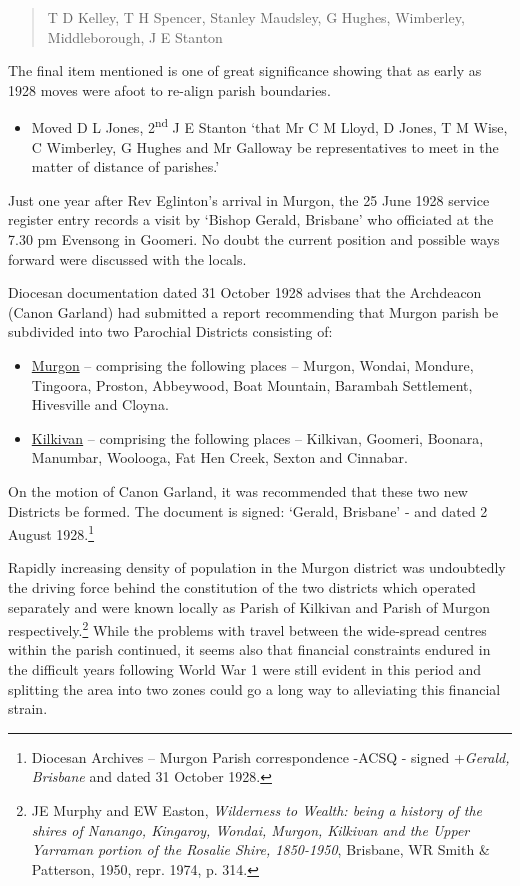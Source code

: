\begin{quote}
T D Kelley, T H Spencer, Stanley Maudsley, G Hughes, Wimberley,
Middleborough, J E Stanton
\end{quote}

The final item mentioned is one of great significance showing that as
early as 1928 moves were afoot to re-align parish boundaries.

\begin{itemize}
\item
  Moved D L Jones, 2\textsuperscript{nd} J E Stanton `that Mr C M Lloyd,
  D Jones, T M Wise, C Wimberley, G Hughes and Mr Galloway be
  representatives to meet in the matter of distance of parishes.'
\end{itemize}

Just one year after Rev Eglinton's arrival in Murgon, the 25 June 1928
service register entry records a visit by `Bishop Gerald, Brisbane' who
officiated at the 7.30 pm Evensong in Goomeri. No doubt the current
position and possible ways forward were discussed with the locals.

Diocesan documentation dated 31 October 1928 advises that the Archdeacon
(Canon Garland) had submitted a report recommending that Murgon parish
be subdivided into two Parochial Districts consisting of:

\begin{itemize}
\item
  \underline{Murgon} -- comprising the following places -- Murgon,
  Wondai, Mondure, Tingoora, Proston, Abbeywood, Boat Mountain, Barambah
  Settlement, Hivesville and Cloyna.
\item
  \underline{Kilkivan} -- comprising the following places -- Kilkivan,
  Goomeri, Boonara, Manumbar, Woolooga, Fat Hen Creek, Sexton and
  Cinnabar.
\end{itemize}

On the motion of Canon Garland, it was recommended that these two new
Districts be formed. The document is signed: `Gerald, Brisbane' - and
dated 2 August 1928.\footnote{Diocesan Archives -- Murgon Parish
  correspondence -ACSQ - signed +\emph{Gerald, Brisbane} and dated 31
  October 1928.}

Rapidly increasing density of population in the Murgon district was
undoubtedly the driving force behind the constitution of the two
districts which operated separately and were known locally as Parish of
Kilkivan and Parish of Murgon respectively.\footnote{JE Murphy and EW
  Easton, \emph{Wilderness to Wealth: being a history of the shires of
  Nanango, Kingaroy, Wondai, Murgon, Kilkivan and the Upper Yarraman
  portion of the Rosalie Shire, 1850-1950}, Brisbane, WR Smith \&
  Patterson, 1950, repr. 1974, p. 314.} While the problems with travel
between the wide-spread centres within the parish continued, it seems
also that financial constraints endured in the difficult years following
World War 1 were still evident in this period and splitting the area
into two zones could go a long way to alleviating this financial strain.


